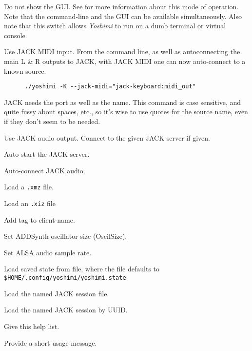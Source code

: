       Do not show the GUI.  See  for more
      information about this mode of operation.  Note that the command-line
      and the GUI can be available simultaneously.  Also note that this
      switch allows \textsl{Yoshimi} to run on a dumb terminal or virtual
      console.

      Use JACK MIDI input.
      From the command line, as well as autoconnecting the main L \& R
      outputs to JACK, with JACK MIDI one can now auto-connect to a known source.

   \begin{verbatim}
      ./yoshimi -K --jack-midi="jack-keyboard:midi_out"
   \end{verbatim}
   
   JACK needs the port as well as the name.
   This command is case sensitive, and quite fussy about spaces, etc.,
   so it's wise to use quotes for the source name, even if they don't seem to
   be needed.

      Use JACK audio output.
      Connect to the given JACK server if given.

      Auto-start the JACK server.

      Auto-connect JACK audio.

      Load a \texttt{.xmz} file.

      Load an \texttt{.xiz} file

      Add tag to client-name.

      Set ADDSynth oscillator size (OscilSize).

      Set ALSA audio sample rate.

      Load saved state from file, where the file defaults to
      \texttt{\$HOME/.config/yoshimi/yoshimi.state}

      Load the named JACK session file.

      Load the named JACK session by UUID.

      Give this help list.

      Provide a short usage message.

